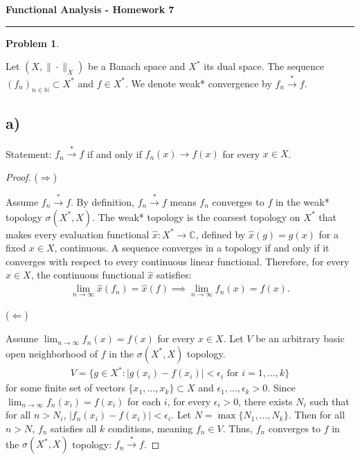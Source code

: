 \documentclass{article}
\newtheorem{problem}{Problem}
\begin{document}
\begin{center}
    \textbf{\Large Functional Analysis - Homework 7}
\end{center}

\hrule
\vspace{0.5em}

\begin{problem}

    
\end{problem}
Let $(X,\|\cdot\|_{X})$ be a Banach space and $X^{*}$ its dual space. The sequence $(f_{n})_{n\in\mathbb{N}} \subset X^{*}$ and $f \in X^{*}$. We denote weak* convergence by $f_{n} \xrightarrow{*} f$.

\subsection*{a)}
Statement: $f_{n} \xrightarrow{*} f$ if and only if $f_{n}(x)\rightarrow f(x)$ for every $x\in X$.

\begin{proof}
    ($\Rightarrow$) 
    
    Assume $f_{n} \xrightarrow{*} f$.
    By definition, $f_{n} \xrightarrow{*} f$ means $f_n$ converges to $f$ in the weak* topology $\sigma(X^{*}, X)$. The weak* topology is the coarsest topology on $X^{*}$ that makes every evaluation functional $\hat{x}: X^* \to \mathbb{C}$, defined by $\hat{x}(g) = g(x)$ for a fixed $x \in X$, continuous.
    A sequence converges in a topology if and only if it converges with respect to every continuous linear functional. Therefore, for every $x \in X$, the continuous functional $\hat{x}$ satisfies:
    \begin{align}
        \lim_{n \to \infty} \hat{x}(f_n) = \hat{x}(f) \implies \lim_{n \to \infty} f_n(x) = f(x).
    \end{align}

    ($\Leftarrow$) 

    Assume $\lim_{n \to \infty} f_{n}(x) = f(x)$ for every $x \in X$.
    Let $V$ be an arbitrary basic open neighborhood of $f$ in the $\sigma(X^*, X)$ topology. 
    \begin{align}
        V = \{ g \in X^* : |g(x_i) - f(x_i)| < \epsilon_i \text{ for } i=1, \dots, k \}
    \end{align}
    for some finite set of vectors $\{x_1, \dots, x_k\} \subset X$ and $\epsilon_1, \dots, \epsilon_k > 0$.
    Since $\lim_{n \to \infty} f_{n}(x_i) = f(x_i)$ for each $i$, for every $\epsilon_i > 0$, there exists $N_i$ such that for all $n > N_i$, $|f_n(x_i) - f(x_i)| < \epsilon_i$.
    Let $N = \max \{N_1, \dots, N_k\}$. Then for all $n > N$, $f_n$ satisfies all $k$ conditions, meaning $f_n \in V$. Thus, $f_n$ converges to $f$ in the $\sigma(X^*, X)$ topology: $f_{n} \xrightarrow{*} f$.
\end{proof}
\end{document}

